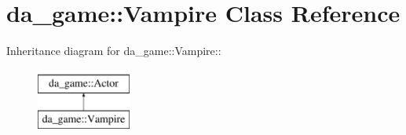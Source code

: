 \hypertarget{classda__game_1_1Vampire}{
\section{da\_\-game::Vampire Class Reference}
\label{classda__game_1_1Vampire}
}
Inheritance diagram for da\_\-game::Vampire::\begin{figure}[H]
\begin{center}
\leavevmode
\includegraphics[height=2cm]{classda__game_1_1Vampire}
\end{center}
\end{figure}
